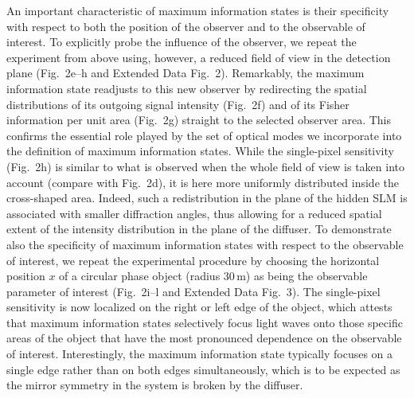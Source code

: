 \documentclass[aps,pra,twocolumn,amsmath,amssymb,superscriptaddress,10pt,nobibnotes]{revtex4-2}
\begin{document}
An important characteristic of maximum information states is their specificity with respect to both the position of the observer and to the observable of interest. To explicitly probe the influence of the observer, we repeat the experiment from above using, however, a reduced field of view in the detection plane (Fig.~2e--h and Extended Data Fig.~2). Remarkably, the maximum information state readjusts to this new observer by redirecting the spatial distributions of its outgoing signal intensity (Fig.~2f) and of its Fisher information per unit area (Fig.~2g) straight to the selected observer area. This confirms the essential role played by the set of optical modes we incorporate into the definition of maximum information states. While the single-pixel sensitivity (Fig.~2h) is similar to what is observed when the whole field of view is taken into account (compare with Fig.~2d), it is here more uniformly distributed inside the cross-shaped area. Indeed, such a redistribution in the plane of the hidden SLM is associated with smaller diffraction angles, thus allowing for a reduced spatial extent of the intensity distribution in the plane of the diffuser. To demonstrate also the specificity of maximum information states with respect to the observable of interest, we repeat the experimental procedure by choosing the horizontal position $x$ of a circular phase object (radius $30$\,\textmu m) as being the observable parameter of interest (Fig.~2i--l and Extended Data Fig.~3). The single-pixel sensitivity is now localized on the right or left edge of the object, which attests that maximum information states selectively focus light waves onto those specific areas of the object that have the most pronounced dependence on the observable of interest. Interestingly, the maximum information state typically focuses on a single edge rather than on both edges simultaneously, which is to be expected as the mirror symmetry in the system is broken by the diffuser.
\end{document}
